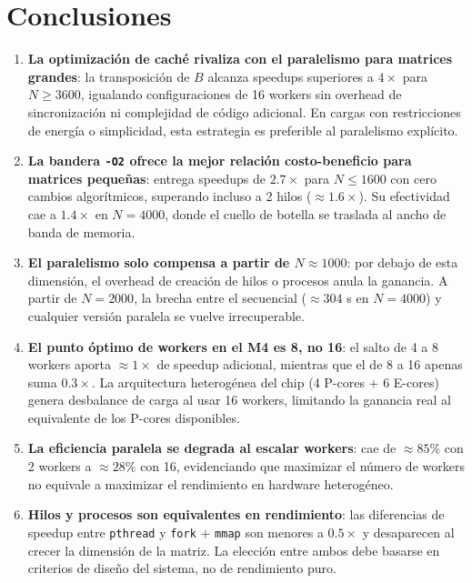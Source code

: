 \documentclass{article}
\begin{document}
\section{Conclusiones}

\begin{enumerate}
    \item \textbf{La optimización de caché rivaliza con el paralelismo para matrices grandes}: 
    la transposición de $B$ alcanza speedups superiores a $4\times$ para $N \geq 3600$, 
    igualando configuraciones de 16 workers sin overhead de sincronización ni complejidad 
    de código adicional. En cargas con restricciones de energía o simplicidad, esta 
    estrategia es preferible al paralelismo explícito.

    \item \textbf{La bandera \texttt{-O2} ofrece la mejor relación costo-beneficio para 
    matrices pequeñas}: entrega speedups de $2.7\times$ para $N \leq 1600$ con cero 
    cambios algorítmicos, superando incluso a 2 hilos ($\approx 1.6\times$). Su efectividad 
    cae a $1.4\times$ en $N = 4000$, donde el cuello de botella se traslada al ancho de 
    banda de memoria.

    \item \textbf{El paralelismo solo compensa a partir de $N \approx 1000$}: por debajo 
    de esta dimensión, el overhead de creación de hilos o procesos anula la ganancia. A 
    partir de $N = 2000$, la brecha entre el secuencial ($\approx 304$ s en $N = 4000$) 
    y cualquier versión paralela se vuelve irrecuperable.

    \item \textbf{El punto óptimo de workers en el M4 es 8, no 16}: el salto de 4 a 8 
    workers aporta $\approx 1\times$ de speedup adicional, mientras que el de 8 a 16 apenas 
    suma $0.3\times$. La arquitectura heterogénea del chip (4 P-cores $+$ 6 E-cores) genera 
    desbalance de carga al usar 16 workers, limitando la ganancia real al equivalente de 
    los P-cores disponibles.

    \item \textbf{La eficiencia paralela se degrada al escalar workers}: cae de $\approx 85\%$ 
    con 2 workers a $\approx 28\%$ con 16, evidenciando que maximizar el número de workers 
    no equivale a maximizar el rendimiento en hardware heterogéneo.

    \item \textbf{Hilos y procesos son equivalentes en rendimiento}: las diferencias de 
    speedup entre \texttt{pthread} y \texttt{fork} $+$ \texttt{mmap} son menores a $0.5\times$ 
    y desaparecen al crecer la dimensión de la matriz. La elección entre ambos debe basarse 
    en criterios de diseño del sistema, no de rendimiento puro.
\end{enumerate}
\end{document}
